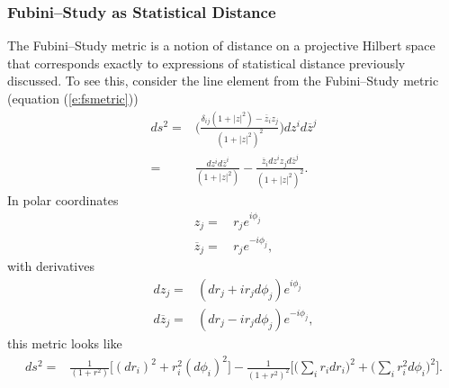 \subsubsection{Fubini--Study as Statistical Distance}

The Fubini--Study metric is a notion of distance on a projective
Hilbert space that corresponds exactly to expressions of statistical
distance previously discussed.  To see this, consider the 
line element from the Fubini--Study
metric 
(equation (\ref{e:fsmetric})) 
\begin{equation}
\begin{split}
ds^2 =& \biggl(
            \frac{\delta_{ij}\left( 1 + |z|^2 \right) - \overline{z}_iz_j}
                 { \left( 1 + |z|^2 \right)^2 }
       \biggr)
       dz^id\overline{z}^j\\
=& \frac{ dz^id\overline{z}^i }{ \left( 1 + |z|^2 \right) }
- \frac{ \overline{z}_idz^iz_jd\overline{z}^j }
                 { \left( 1 + |z|^2 \right)^2 }.
\end{split}
\end{equation}
In polar coordinates
\begin{equation}
\begin{split}
z_j=&\,r_je^{i\phi_j}\\
\overline{z}_j=&\,r_je^{-i\phi_j},
\end{split}
\end{equation}
with derivatives
\begin{equation}
\begin{split}
dz_j =& \left( dr_j + ir_jd\phi_j \right) e^{i\phi_j}\\
d\overline{z}_j =& \left( dr_j - ir_jd\phi_j \right) e^{-i\phi_j},
\end{split}
\end{equation}
this metric looks like
\begin{equation}
\begin{split}
ds^2 =& \frac{1}{\left( 1+r^2 \right)}
    \biggl[\left(dr_i\right)^2 + r_i^2\left(d\phi_i\right)^2\biggr]
- \frac{1}{\left( 1+r^2 \right)^2}
    \biggl[\biggl(\sum_i r_idr_i\biggr)^2
           + \biggl(\sum_i r_i^2d\phi_i\biggr)^2
    \biggr].
\end{split}
\end{equation}














